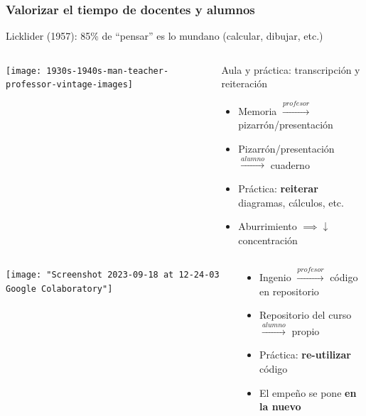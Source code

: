 \documentclass[aspectratio=43]{beamer}
\begin{document}
\begin{frame}
	\frametitle{Valorizar el tiempo de docentes y alumnos}
	Licklider (1957): 85\% de ``pensar'' es lo mundano (calcular, dibujar, etc.)
	\pause
	\begin{block}{}
	  \begin{columns}[b]
			\begin{column}{0.3\textwidth}
				\texttt{[image: 1930s-1940s-man-teacher-professor-vintage-images]}
			\end{column}
			\begin{column}{0.65\textwidth}
				Aula y práctica: transcripción y reiteración
				\begin{itemize}[<+->]
					\item Memoria \(\xrightarrow{profesor}\) pizarrón/presentación
					\item Pizarrón/presentación \(\xrightarrow{alumno}\) cuaderno
					\item Práctica: \textbf{reiterar} diagramas, cálculos, etc.
					\item Aburrimiento \(\implies \downarrow\) concentración
				\end{itemize}
			\end{column}
		\end{columns}
	\end{block}
	\pause
	\begin{block}{}
	  \begin{columns}[b]
			\begin{column}{0.3\textwidth}
				\texttt{[image: "Screenshot 2023-09-18 at 12-24-03 Google Colaboratory"]}
			\end{column}
			\begin{column}{0.65\textwidth}
				\begin{itemize}[<+->]
					\item Ingenio \(\xrightarrow{profesor}\) código en repositorio
					\item Repositorio del curso \(\xrightarrow{alumno}\) propio
					\item Práctica: \textbf{re-utilizar} código
					\item El empeño se pone \textbf{en la nuevo}
				\end{itemize}
			\end{column}
		\end{columns}
	\end{block}
\end{frame}
\end{document}
